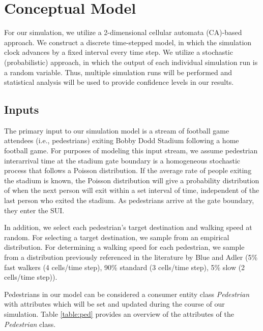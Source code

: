 \documentclass[12pt]{article}
\begin{document}
\section{Conceptual Model}
For our simulation, we utilize a 2-dimensional cellular automata (CA)-based
approach. We construct a discrete time-stepped model, in which the simulation
clock advances by a fixed interval every time step. We utilize a stochastic
(probabilistic) approach, in which the output of each individual simulation
run is a random variable. Thus, multiple simulation runs will be performed and
statistical analysis will be used to provide confidence levels in our results.

\subsection{Inputs}
The primary input to our simulation model is a stream of football game attendees
(i.e., pedestrians) exiting Bobby Dodd Stadium following a home football game.
For purposes of modeling this input stream, we assume pedestrian interarrival
time at the stadium gate boundary is a homogeneous stochastic process that
follows a Poisson distribution. If the average rate of people exiting the
stadium is known, the Poisson distribution will give a probability distribution
of when the next person will exit within a set interval of time, independent
of the last person who exited the stadium. As pedestrians arrive at the gate
boundary, they enter the SUI.

In addition, we select each pedestrian's target destination and walking
speed at random. For selecting a target destination, we sample from
an empirical distribution. For determining a walking speed for each pedestrian,
we sample from a distribution previously referenced in the literature by Blue
and Adler \cite{blue2001cellular} (5\% fast walkers (4 cells/time step), 90\%
standard (3 cells/time step), 5\% slow (2 cells/time step)).

Pedestrians in our model can be considered a consumer entity class
\textit{Pedestrian} with attributes which will be set and updated during the
course of our simulation. Table \ref{table:ped} provides an overview of the
attributes of the \textit{Pedestrian} class.
\end{document}
